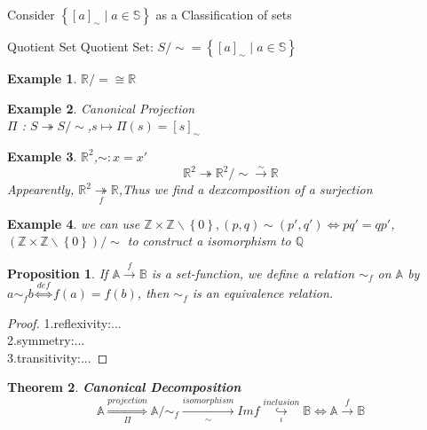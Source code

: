 \documentclass[13pt, a4paper, oneside]{book}
\newtheorem{theorem}{Theorem}[section]
\newtheorem{pro}[theorem]{Proposition}
\newtheorem{example}{Example}[section]
\begin{document}
	Consider $ \left\{ \left[ a \right]_{\sim} \mid a \in \mathbb{S} \right\}$ as a Classification of sets
	
	\begin{definition}{Quotient Set}{}
		Quotient Set: $ S/ \sim = \left\{ \left[ a \right]_{\sim} \mid a \in \mathbb{S} \right\}$
	\end{definition}
	
	\begin{example}
		$ \mathbb{R} / = \cong \mathbb{R} $
	\end{example}
	
	\begin{example}
		Canonical Projection \\
		$\Pi$ : $ S \twoheadrightarrow S/ \sim $,$s \longmapsto \Pi (s) = \left[ s \right]_{\sim}$
	\end{example}
	
	\begin{example}
		$\mathbb{R}^2$,$\sim:x = x'$ \\
		$$ \mathbb{R}^2 \twoheadrightarrow \mathbb{R}^2/ \sim \overset{ \sim }{\longrightarrow} \mathbb{R}$$
		Appearently, $ \mathbb{R}^2 \underset{f}{ \twoheadrightarrow } \mathbb{R} $,Thus we find a dexcomposition of a surjection
	\end{example}
	
	\begin{example}
		we can use $\mathbb{Z} \times \mathbb{Z} \backslash \left\{0\right\}, (p,q) \sim (p',q') \Longleftrightarrow pq' = qp'$,$\left( \mathbb{Z} \times \mathbb{Z} \backslash \left\{0\right\} \right) / \sim$ to construct a isomorphism to $\mathbb{Q}$
	\end{example}
	
	\begin{pro}
		If $\mathbb{A} \overset{f}{\longrightarrow} \mathbb{B}$ is a set-function, we define a relation  $ \sim_{f} $ on $\mathbb{A}$ by $ a\sim_{f} b \overset{def}{\Longleftrightarrow} f(a) = f(b) $, then $\sim_{f}$ is an equivalence relation.
	\end{pro}
	
	\begin{proof}
		1.reflexivity:... \\
		2.symmetry:... \\
		3.transitivity:... 
	\end{proof}
	
	\begin{theorem}
		\Large \textbf{Canonical Decomposition} \\
		$$ \mathbb{A} \overset{projection}{\underset{\Pi}{\Longrightarrow}} \mathbb{A}/ \sim_{f} \overset{isomorphism}{\underset{\sim }{\longrightarrow}} Imf \underset{\iota}{\overset{inclusion}{\hookrightarrow}} \mathbb{B} \Longleftrightarrow \mathbb{A} \overset{f}{\longrightarrow} \mathbb{B}$$
	\end{theorem}
	
\end{document}
